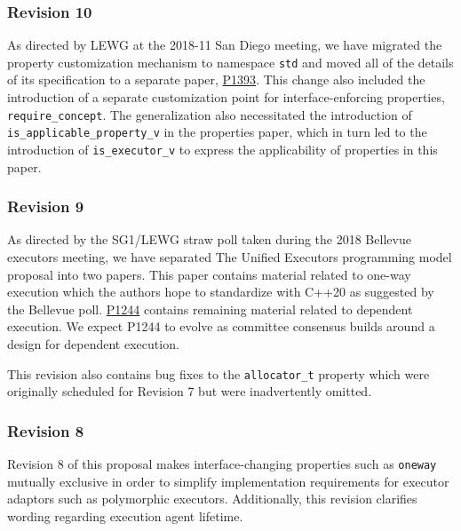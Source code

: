 \documentclass[a4paper,12pt,notitlepage,twoside,openright]{article}
\begin{document}
\hypertarget{revision-10}{%
\subsubsection{Revision 10}\label{revision-10}}

As directed by LEWG at the 2018-11 San Diego meeting, we have migrated
the property customization mechanism to namespace
\texttt{std} and moved all of the details of its
specification to a separate paper, \href{http://wg21.link/P1393}{P1393}.
This change also included the introduction of a separate customization
point for interface-enforcing properties,
\texttt{require_concept}. The generalization also
necessitated the introduction of
\texttt{is_applicable_property_v} in the properties paper,
which in turn led to the introduction of
\texttt{is_executor_v} to express the applicability of
properties in this paper.

\hypertarget{revision-9}{%
\subsubsection{Revision 9}\label{revision-9}}

As directed by the SG1/LEWG straw poll taken during the 2018 Bellevue
executors meeting, we have separated The Unified Executors programming
model proposal into two papers. This paper contains material related to
one-way execution which the authors hope to standardize with C++20 as
suggested by the Bellevue poll. \href{http://wg21.link/P1244}{P1244}
contains remaining material related to dependent execution. We expect
P1244 to evolve as committee consensus builds around a design for
dependent execution.

This revision also contains bug fixes to the
\texttt{allocator_t} property which were originally
scheduled for Revision 7 but were inadvertently omitted.

\hypertarget{revision-8}{%
\subsubsection{Revision 8}\label{revision-8}}

Revision 8 of this proposal makes interface-changing properties such as
\texttt{oneway} mutually exclusive in order to simplify
implementation requirements for executor adaptors such as polymorphic
executors. Additionally, this revision clarifies wording regarding
execution agent lifetime.
\end{document}
